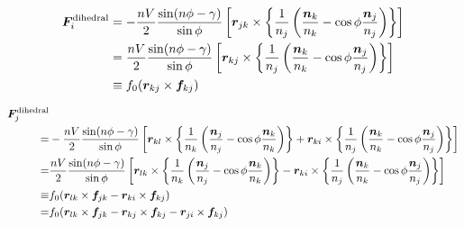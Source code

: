 \begin{align}
   \bm{F}_{i}^{\mathrm{dihedral}}
 &=
   -\frac{nV}{2} \frac{\sin(n\phi - \gamma)}{\sin{\phi}}
    \left[
              \bm{r}_{jk} \times
     \left\{
            \frac{1}{n_{j}}
            \left(
                   \frac{\bm{n}_{k}}{n_{k}} - \cos\phi \frac{\bm{n}_{j}}{n_{j}}
            \right)
     \right\}
    \right]
 \notag
 \\
 &=
   \frac{nV}{2} \frac{\sin(n\phi - \gamma)}{\sin{\phi}}
   \left[
              \bm{r}_{kj} \times
     \left\{
            \frac{1}{n_{j}}
            \left(
                   \frac{\bm{n}_{k}}{n_{k}} - \cos\phi \frac{\bm{n}_{j}}{n_{j}}
            \right)
     \right\}
   \right]
 \notag
 \\
 &\equiv
  f_{0} (\bm{r}_{kj} \times \bm{f}_{kj})
 \notag
\end{align}

\begin{align}
   \bm{F}_{j}^{\mathrm{dihedral}} &
   \notag
   \\
   =&
     -\frac{nV}{2} \frac{\sin(n\phi - \gamma)}{\sin{\phi}}
      \left[
              \bm{r}_{kl} \times
              \left\{
              \frac{1}{n_{k}}
              \left(
                     \frac{\bm{n}_{j}}{n_{j}} - \cos\phi \frac{\bm{n}_{k}}{n_{k}}
              \right)
              \right\}
            +
              \bm{r}_{ki} \times
              \left\{
              \frac{1}{n_{j}}
              \left(
                     \frac{\bm{n}_{k}}{n_{k}} - \cos\phi \frac{\bm{n}_{j}}{n_{j}}
              \right)
              \right\}
      \right]
   \notag
   \\
   =&
      \frac{nV}{2} \frac{\sin(n\phi - \gamma)}{\sin{\phi}}
      \left[
              \bm{r}_{lk} \times
              \left\{
              \frac{1}{n_{k}}
              \left(
                     \frac{\bm{n}_{j}}{n_{j}} - \cos\phi \frac{\bm{n}_{k}}{n_{k}}
              \right)
              \right\}
            -
              \bm{r}_{ki} \times
              \left\{
              \frac{1}{n_{j}}
              \left(
                     \frac{\bm{n}_{k}}{n_{k}} - \cos\phi \frac{\bm{n}_{j}}{n_{j}}
              \right)
              \right\}
      \right]
   \notag
   \\
   \equiv&
     f_{0} (\bm{r}_{lk} \times \bm{f}_{jk} - \bm{r}_{ki} \times \bm{f}_{kj})
   \notag
   \\
   =&
     f_{0} (  \bm{r}_{lk} \times \bm{f}_{jk}
            - \bm{r}_{kj} \times \bm{f}_{kj}
            - \bm{r}_{ji} \times \bm{f}_{kj} )
   \notag
\end{align}

